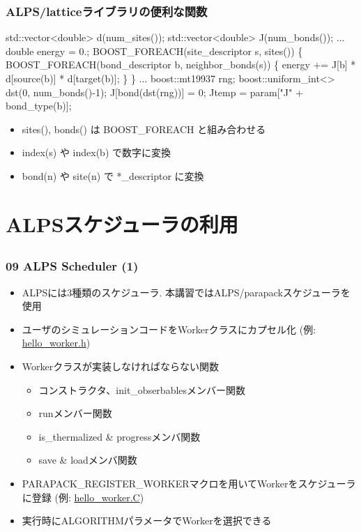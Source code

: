 \begin{frame}[fragile,shrink=10] \frametitle{ALPS/latticeライブラリの便利な関数}
\begin{semiverbatim}
std::vector<double> d(\alert{num_sites()});
std::vector<double> J(\alert{num_bonds()});
...
double energy = 0.;
BOOST\_FOREACH(site_descriptor s, \alert{sites()}) \{
  BOOST\_FOREACH(bond_descriptor b, \alert{neighbor_bonds(s)}) \{
    energy += J[b] * d[\alert{source(b)}] * d[\alert{target(b)}];
  \}
\}
...
boost::mt19937 rng;
boost::uniform_int<> dst(0, \alert{num_bonds()}-1);
J[\alert{bond(dst(rng))}] = 0;
Jtemp = param["J" + \alert{bond_type(b)}];
\end{semiverbatim}
  \begin{itemize}
  \item sites(), bonds() は BOOST\_FOREACH と組み合わせる
  \item index(s) や index(b) で数字に変換
  \item bond(n) や site(n) で *\_descriptor に変換
  \end{itemize}
\end{frame}

\section{ALPSスケジューラの利用}
\subsection*{\redm\whitem\greenb}

\begin{frame}[fragile]
  \frametitle{09 ALPS Scheduler (1)}
  \begin{itemize}
    \item ALPSには3種類のスケジューラ. 本講習ではALPS/parapackスケジューラを使用
    \item ユーザのシミュレーションコードをWorkerクラスにカプセル化 (例: \href{https://github.com/cmsi/alps-tutorial/blob/develop/alpsize/09-hello_worker.h}{hello\_worker.h})
    \item Workerクラスが実装しなければならない関数
      \begin{itemize}
        \item コンストラクタ、init\_obserbablesメンバー関数
        \item runメンバー関数
        \item is\_thermalized \& progressメンバ関数
        \item save \& loadメンバ関数
      \end{itemize}
    \item PARAPACK\_REGISTER\_WORKERマクロを用いてWorkerをスケジューラに登録 (例: \href{https://github.com/cmsi/alps-tutorial/blob/develop/alpsize/09-hello_worker.C}{hello\_worker.C})
    \item 実行時にALGORITHMパラメータでWorkerを選択できる
  \end{itemize}
\end{frame}

